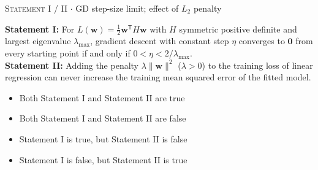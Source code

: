 \documentclass[11pt,a4paper]{article}
\newcommand{\optlabel}[1]{\textbf{(#1)}}
\newcommand{\correctlabel}[1]{\textcolor{okgreen}{\textbf{(#1)}\,\ding{51}}}
\newenvironment{qitem}[1]{\begin{list}{}{\setlength{\leftmargin}{3.3em}\setlength{\labelwidth}{3.1em}%
  \setlength{\labelsep}{0.2em}\setlength{\topsep}{3pt}\setlength{\parsep}{3pt}}\item[\textbf{Q.#1}\hfill]}{\end{list}}
\newcommand{\qmeta}[2]{{\footnotesize\color{black!60}\textsc{#1} \;$\cdot$\; #2}\par}
\begin{document}
\begin{qitem}{18}
\qmeta{Statement I / II}{GD step-size limit; effect of $L_2$ penalty}
\textbf{Statement I:} For $L(\mathbf w) = \frac12\mathbf w^{\mathsf T}H\mathbf w$ with $H$ symmetric positive definite and
largest eigenvalue $\lambda_{\max}$, gradient descent with constant step $\eta$ converges to $\mathbf 0$ from every starting
point if and only if $0 < \eta < 2/\lambda_{\max}$.\\[1mm]
\textbf{Statement II:} Adding the penalty $\lambda\|\mathbf w\|^2$ ($\lambda > 0$) to the training loss of linear regression
can never increase the training mean squared error of the fitted model.
\begin{itemize}[leftmargin=2.6em, labelsep=0.4em, itemsep=2pt, topsep=3pt]
\item[\optlabel{A}] Both Statement I and Statement II are true
\item[\optlabel{B}] Both Statement I and Statement II are false
\item[\correctlabel{C}] Statement I is true, but Statement II is false
\item[\optlabel{D}] Statement I is false, but Statement II is true
\end{itemize}
\end{qitem}
\end{document}
